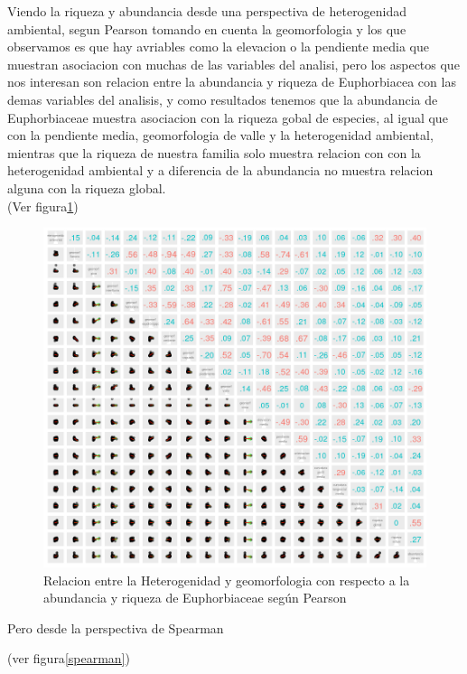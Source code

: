 \documentclass[11pt,]{article}
\begin{document}
Viendo la riqueza y abundancia desde una perspectiva de heterogenidad
ambiental, segun Pearson tomando en cuenta la geomorfologia y los que
observamos es que hay avriables como la elevacion o la pendiente media
que muestran asociacion con muchas de las variables del analisi, pero
los aspectos que nos interesan son relacion entre la abundancia y
riqueza de Euphorbiacea con las demas variables del analisis, y como
resultados tenemos que la abundancia de Euphorbiaceae muestra asociacion
con la riqueza gobal de especies, al igual que con la pendiente media,
geomorfologia de valle y la heterogenidad ambiental, mientras que la
riqueza de nuestra familia solo muestra relacion con con la
heterogenidad ambiental y a diferencia de la abundancia no muestra
relacion alguna con la riqueza global.\\
(Ver figura\ref{fig:geo_pearson})

\begin{figure}
\centering
\includegraphics{geo_pearson.png}
\caption{\label{fig:geo_pearson} Relacion entre la Heterogenidad y
geomorfologia con respecto a la abundancia y riqueza de Euphorbiaceae
según Pearson}
\end{figure}

Pero desde la perspectiva de Spearman

(ver figura\ref{spearman})
\end{document}
